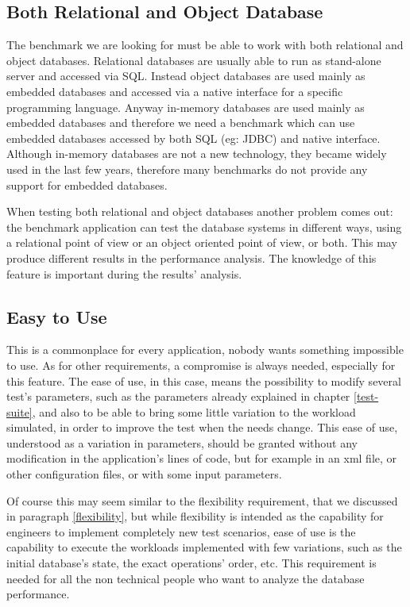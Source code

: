 		\subsection{Both Relational and Object Database}
The benchmark we are looking for must be able to work with both relational and object databases. Relational databases are usually able to run as stand-alone server and accessed via SQL. Instead object databases are used mainly as embedded databases and accessed via a native interface for a specific programming language. Anyway in-memory databases are used mainly as embedded databases and therefore we need a benchmark which can use embedded databases accessed by both SQL (eg: JDBC) and native interface. Although in-memory databases are not a new technology, they became widely used in the last few years, therefore many benchmarks do not provide any support for embedded databases.

When testing both relational and object databases another problem comes out: the benchmark application can test the database systems in different ways, using a relational point of view or an object oriented point of view, or both. This may produce different results in the performance analysis. The knowledge of this feature is important during the results' analysis.

		\subsection{Easy to Use}
This is a commonplace for every application, nobody wants something impossible to use. As for other requirements, a compromise is always needed, especially for this feature. The ease of use, in this case, means the possibility to modify several test's parameters, such as the parameters already explained in chapter \ref{test-suite}, and also to be able to bring some little variation to the workload simulated, in order to improve the test when the needs change. This ease of use, understood as a variation in parameters, should be granted without any modification in the application's lines of code, but for example in an xml file, or other configuration files, or with some input parameters.

Of course this may seem similar to the flexibility requirement, that we discussed in paragraph \ref{flexibility}, but while flexibility is intended as the capability for engineers to implement completely new test scenarios, ease of use is the capability to execute the workloads implemented with few variations, such as the initial database's state, the exact operations' order, etc. This requirement is needed for all the non technical people who want to analyze the database performance.

